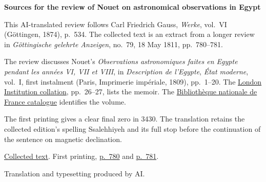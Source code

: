\clearpage\thispagestyle{empty}
\begin{center}\textbf{Sources for the review of Nouet on astronomical observations in Egypt}\end{center}
\noindent This AI-translated review follows Carl Friedrich Gauss, \textit{Werke}, vol.~VI (Göttingen, 1874), p.~534. The collected text is an extract from a longer review in \textit{Göttingische gelehrte Anzeigen}, no.~79, 18 May 1811, pp.~780--781.
\par\smallskip\noindent The review discusses Nouet's \textit{Observations astronomiques faites en Egypte pendant les années VI, VII et VIII}, in \textit{Description de l'Egypte}, \textit{État moderne}, vol.~I, first instalment (Paris, Imprimerie impériale, 1809), pp.~1--20. The \href{https://archive.org/details/bibliographicala00thom}{London Institution collation}, pp.~26--27, lists the memoir. The \href{https://catalogue.bnf.fr/ark:/12148/cb35129066r}{Bibliothèque nationale de France catalogue} identifies the volume.
\par\smallskip\noindent The first printing gives a clear final zero in 3430. The translation retains the collected edition's spelling Ssalehhiyeh and its full stop before the continuation of the sentence on magnetic declination.
\par\smallskip\noindent \href{https://gdz.sub.uni-goettingen.de/id/PPN236007467}{Collected text}. First printing, \href{https://images.p.sub.uni-goettingen.de/iiif/image/gdz:PPN319721507_1811:00000812/full/1650,/0/default.jpg}{p.~780} and \href{https://images.p.sub.uni-goettingen.de/iiif/image/gdz:PPN319721507_1811:00000813/full/1650,/0/default.jpg}{p.~781}.
\par\smallskip\noindent Translation and typesetting produced by AI.
\clearpage

